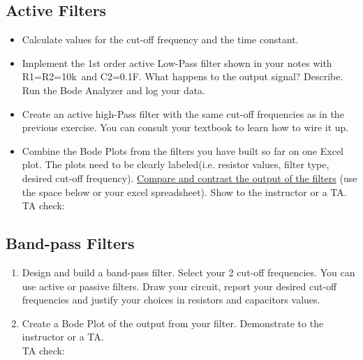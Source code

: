\documentclass{article}
\begin{document}
\subsection*{Active Filters}
\begin{itemize}
	\item Calculate values for the cut-off frequency and the time constant.\vspace{3cm}
	\item Implement the 1st order active Low-Pass filter shown in your notes with R1=R2=10k\textOmega\ and C2=0.1\textmu F. What happens to the output signal? Describe. Run the Bode Analyzer and log your data.\vspace{4cm}
	\item Create an active high-Pass filter with the same cut-off frequencies as in the previous exercise. You can consult your textbook to learn how to wire it up.
	\item Combine the Bode Plots from the filters you have built so far on one Excel plot. The plots need to be clearly labeled(i.e. resistor values, filter type, desired cut-off frequency). \underline{Compare and contrast the output of the filters} (use the space below or your excel spreadsheet). Show to the instructor or a TA.\vspace{3cm}\\TA check: \underline{\hspace{2cm}}
\end{itemize}

\subsection*{Band-pass Filters}
\begin{enumerate}
	\item Design and build a band-pass filter. Select your 2 cut-off frequencies. You can use active or passive filters. Draw your circuit, report your desired cut-off frequencies and justify your choices in resistors and capacitors values.\vspace{5cm}
	\item Create a Bode Plot of the output from your filter. Demonstrate to the instructor or a TA.\vspace{3cm}\\TA check: \underline{\hspace{2cm}}
\end{enumerate}
\end{document}
